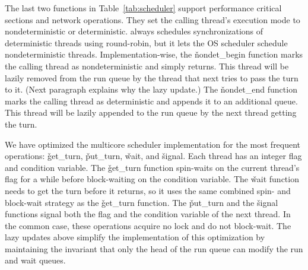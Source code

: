 The last two functions in Table~\ref{tab:scheduler} support performance
critical sections and network operations.  They set the calling thread's
execution mode to nondeterministic or deterministic. \parrot always schedules
synchronizations of deterministic threads using round-robin, but it lets
the OS scheduler schedule nondeterministic threads.
Implementation-wise, the \v{nondet\_begin} function marks the calling
thread as nondeterministic and simply returns.  This thread will be lazily
removed from the run queue by the thread that next tries to pass the turn to it.
(Next paragraph explains why the lazy update.)
The \v{nondet\_end} function marks the calling thread as deterministic and
appends it to an additional queue.  This thread will be lazily appended to
the run queue by the next thread getting the turn.

We have optimized the multicore scheduler implementation for the most frequent
operations: \v{get\_turn}, \v{put\_turn}, \v{wait}, and \v{signal}.  Each
thread has an integer flag and condition variable. The \v{get\_turn} function
spin-waits on the current thread's flag for a while before block-waiting
on the condition variable. The \v{wait} function needs to get the turn before it
returns, so it uses the same combined spin- and block-wait strategy as
the \v{get\_turn} function. The \v{put\_turn} and the 
\v{signal} functions signal both the flag and the
condition variable of the next thread.  In the common case, these
operations acquire no lock and do not block-wait.  The lazy updates above
simplify the implementation of this optimization by maintaining the
invariant that only the head of the run queue can modify the run and wait
queues.


